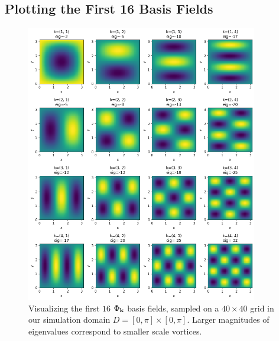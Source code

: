 \appendix
\chapter*{\fuggelek}
\setcounter{chapter}{\appendixnumber}

\section{Plotting the First 16 Basis Fields}
\label{appendix:first_16}

\begin{figure}[!htb]
  \centering
    \includegraphics[width=0.9\textwidth]{figures/eigenfluids/16_basis_fields.png}
    \caption{Visualizing the first $16$ $\Phi_{\vb{k}}$ basis fields, sampled on
    a $40 \times 40$ grid in our simulation domain $D = [0,\pi] \times [0,\pi]$.
    Larger magnitudes of eigenvalues correspond to smaller scale
  vortices.}
\end{figure}
